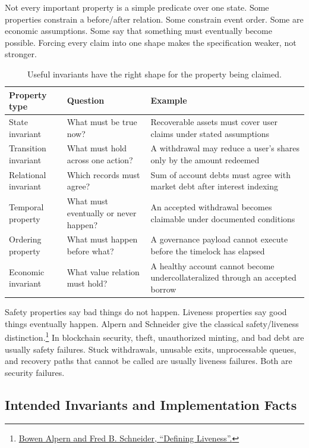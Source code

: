 Not every important property is a simple predicate over one state. Some properties constrain a before/after relation. Some constrain event order. Some are economic assumptions. Some say that something must eventually become possible. Forcing every claim into one shape makes the specification weaker, not stronger.

\begin{table}[htbp]
\centering
\small
\renewcommand{\arraystretch}{1.18}
\begin{tabularx}{\textwidth}{@{}>{\RaggedRight\arraybackslash}p{}>{\RaggedRight\arraybackslash}p{}X@{}}
\toprule
Property type & Question & Example \\
\midrule
State invariant & What must be true now? & Recoverable assets must cover user claims under stated assumptions \\
Transition invariant & What must hold across one action? & A withdrawal may reduce a user's shares only by the amount redeemed \\
Relational invariant & Which records must agree? & Sum of account debts must agree with market debt after interest indexing \\
Temporal property & What must eventually or never happen? & An accepted withdrawal becomes claimable under documented conditions \\
Ordering property & What must happen before what? & A governance payload cannot execute before the timelock has elapsed \\
Economic invariant & What value relation must hold? & A healthy account cannot become undercollateralized through an accepted borrow \\
\bottomrule
\end{tabularx}
\caption{Useful invariants have the right shape for the property being claimed.}
\end{table}

Safety properties say bad things do not happen. Liveness properties say good things eventually happen. Alpern and Schneider give the classical safety/liveness distinction.\footnote{\href{https://www.cs.cornell.edu/fbs/publications/DefLiveness.pdf}{Bowen Alpern and Fred B. Schneider, ``Defining Liveness''.}} In blockchain security, theft, unauthorized minting, and bad debt are usually safety failures. Stuck withdrawals, unusable exits, unprocessable queues, and recovery paths that cannot be called are usually liveness failures. Both are security failures.

\subsection{Intended Invariants and Implementation Facts}

